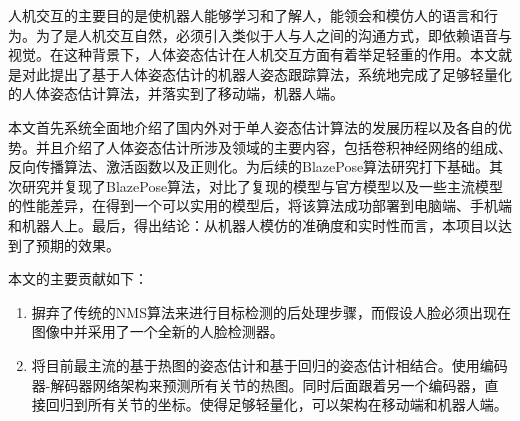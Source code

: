 \begin{cabstract}
人机交互的主要目的是使机器人能够学习和了解人，能领会和模仿人的语言和行为。为了是人机交互自然，必须引入类似于人与人之间的沟通方式，即依赖语音与视觉。在这种背景下，人体姿态估计在人机交互方面有着举足轻重的作用。本文就是对此提出了基于人体姿态估计的机器人姿态跟踪算法，系统地完成了足够轻量化的人体姿态估计算法，并落实到了移动端，机器人端。

本文首先系统全面地介绍了国内外对于单人姿态估计算法的发展历程以及各自的优势。并且介绍了人体姿态估计所涉及领域的主要内容，包括卷积神经网络的组成、反向传播算法、激活函数以及正则化。为后续的BlazePose算法研究打下基础。其次研究并复现了BlazePose算法，对比了复现的模型与官方模型以及一些主流模型的性能差异，在得到一个可以实用的模型后，将该算法成功部署到电脑端、手机端和机器人上。最后，得出结论：从机器人模仿的准确度和实时性而言，本项目以达到了预期的效果。

本文的主要贡献如下：

\begin{enumerate}
\item 摒弃了传统的NMS算法来进行目标检测的后处理步骤，而假设人脸必须出现在图像中并采用了一个全新的人脸检测器。

\item 将目前最主流的基于热图的姿态估计和基于回归的姿态估计相结合。使用编码器-解码器网络架构来预测所有关节的热图。同时后面跟着另一个编码器，直接回归到所有关节的坐标。使得足够轻量化，可以架构在移动端和机器人端。
\end{enumerate}
\end{cabstract}


